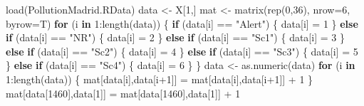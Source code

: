 \documentclass[
]{article}
\newenvironment{Shaded}{\begin{snugshade}}{\end{snugshade}}
\newcommand{\AttributeTok}[1]{\textcolor[rgb]{0.77,0.63,0.00}{#1}}
\newcommand{\ControlFlowTok}[1]{\textcolor[rgb]{0.13,0.29,0.53}{\textbf{#1}}}
\newcommand{\DecValTok}[1]{\textcolor[rgb]{0.00,0.00,0.81}{#1}}
\newcommand{\FunctionTok}[1]{\textcolor[rgb]{0.00,0.00,0.00}{#1}}
\newcommand{\NormalTok}[1]{#1}
\newcommand{\OtherTok}[1]{\textcolor[rgb]{0.56,0.35,0.01}{#1}}
\newcommand{\SpecialCharTok}[1]{\textcolor[rgb]{0.00,0.00,0.00}{#1}}
\newcommand{\StringTok}[1]{\textcolor[rgb]{0.31,0.60,0.02}{#1}}
\begin{document}
\begin{Shaded}
\begin{Highlighting}[]
\FunctionTok{load}\NormalTok{(}\StringTok{\textquotesingle{}PollutionMadrid.RData\textquotesingle{}}\NormalTok{)}
\NormalTok{data }\OtherTok{\textless{}{-}}\NormalTok{  X[}\DecValTok{1}\NormalTok{,]}
\NormalTok{mat }\OtherTok{\textless{}{-}} \FunctionTok{matrix}\NormalTok{(}\FunctionTok{rep}\NormalTok{(}\DecValTok{0}\NormalTok{,}\DecValTok{36}\NormalTok{), }\AttributeTok{nrow=}\DecValTok{6}\NormalTok{, }\AttributeTok{byrow=}\NormalTok{T)}
\ControlFlowTok{for}\NormalTok{ (i }\ControlFlowTok{in} \DecValTok{1}\SpecialCharTok{:}\FunctionTok{length}\NormalTok{(data)) \{}
  \ControlFlowTok{if}\NormalTok{ (data[i] }\SpecialCharTok{==} \StringTok{"Alert"}\NormalTok{) \{}
\NormalTok{    data[i] }\OtherTok{=} \DecValTok{1}
\NormalTok{  \} }\ControlFlowTok{else} \ControlFlowTok{if}\NormalTok{ (data[i] }\SpecialCharTok{==} \StringTok{"NR"}\NormalTok{) \{}
\NormalTok{    data[i] }\OtherTok{=} \DecValTok{2}
\NormalTok{  \} }\ControlFlowTok{else} \ControlFlowTok{if}\NormalTok{ (data[i] }\SpecialCharTok{==} \StringTok{"Sc1"}\NormalTok{) \{}
\NormalTok{    data[i] }\OtherTok{=} \DecValTok{3}
\NormalTok{  \} }\ControlFlowTok{else} \ControlFlowTok{if}\NormalTok{ (data[i] }\SpecialCharTok{==} \StringTok{"Sc2"}\NormalTok{) \{}
\NormalTok{    data[i] }\OtherTok{=} \DecValTok{4} 
\NormalTok{  \} }\ControlFlowTok{else} \ControlFlowTok{if}\NormalTok{ (data[i] }\SpecialCharTok{==} \StringTok{"Sc3"}\NormalTok{) \{}
\NormalTok{    data[i] }\OtherTok{=} \DecValTok{5}
\NormalTok{  \} }\ControlFlowTok{else} \ControlFlowTok{if}\NormalTok{ (data[i] }\SpecialCharTok{==} \StringTok{"Sc4"}\NormalTok{) \{}
\NormalTok{    data[i] }\OtherTok{=} \DecValTok{6}
\NormalTok{  \}}
\NormalTok{\}}
\NormalTok{data }\OtherTok{\textless{}{-}} \FunctionTok{as.numeric}\NormalTok{(data)}
\ControlFlowTok{for}\NormalTok{ (i }\ControlFlowTok{in} \DecValTok{1}\SpecialCharTok{:}\FunctionTok{length}\NormalTok{(data)) \{}
\NormalTok{  mat[data[i],data[i}\SpecialCharTok{+}\DecValTok{1}\NormalTok{]] }\OtherTok{=}\NormalTok{ mat[data[i],data[i}\SpecialCharTok{+}\DecValTok{1}\NormalTok{]] }\SpecialCharTok{+} \DecValTok{1}
\NormalTok{\}}
\NormalTok{mat[data[}\DecValTok{1460}\NormalTok{],data[}\DecValTok{1}\NormalTok{]] }\OtherTok{=}\NormalTok{ mat[data[}\DecValTok{1460}\NormalTok{],data[}\DecValTok{1}\NormalTok{]] }\SpecialCharTok{+} \DecValTok{1}


\end{Highlighting}
\end{Shaded}
\end{document}
